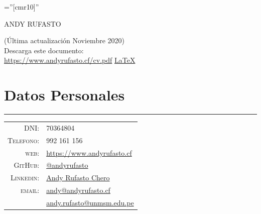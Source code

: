 \documentclass[a4paper,10pt]{article}
\begin{document}
\pagestyle{empty} %

\font\fb=''[cmr10]'' %


\par{\centering
		{\Huge ANDY RUFASTO\\ \bigskip\par} }



\hfill\begin{minipage}{0.5\linewidth}
	(Última actualización Noviembre 2020)\\ 
	Descarga este documento:\\
 	\href{https://www.andyrufasto.cf/cv.pdf}{https://www.andyrufasto.cf/cv.pdf}
	\href{https://www.github.com/andyrufasto.cf/cv}{\LaTeX}
\end{minipage}

\section{Datos Personales}
	\hrule
	\begin{tabular}{rl}
    \textsc{DNI:}       & 70364804\\
    \textsc{Telefono:}  & 992 161 156\\
    \textsc{web:}       & \href{https://www.andyrufasto.cf}{https://www.andyrufasto.cf}\\
    \textsc{GitHub:}    & \href{https://www.github.com/andyrufasto}{@andyrufasto}\\
    \textsc{Linkedin:}  & \href{https://www.linkedin.com/in/andyrufasto/}{Andy Rufasto Chero}\\
    \textsc{email:}     & \href{mailto:andy@andyrufasto.cf}{andy@andyrufasto.cf}\\
				                & \href {mailto:andy.rufasto@unmsm.edu.pe}{andy.rufasto@unmsm.edu.pe}\\
	\end{tabular}
\end{document}
